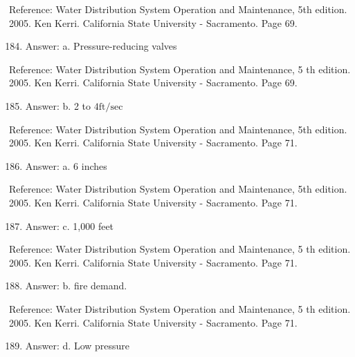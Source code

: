 \documentclass[10pt]{article}
\begin{document}
Reference: Water Distribution System Operation and Maintenance, 5th edition. 2005. Ken Kerri. California State University - Sacramento. Page 69.

\begin{enumerate}
  \setcounter{enumi}{183}
  \item Answer: a. Pressure-reducing valves
\end{enumerate}

Reference: Water Distribution System Operation and Maintenance, 5 th edition. 2005. Ken Kerri. California State University - Sacramento. Page 69.

\begin{enumerate}
  \setcounter{enumi}{184}
  \item Answer: b. 2 to $4 \mathrm{ft} / \mathrm{sec}$
\end{enumerate}

Reference: Water Distribution System Operation and Maintenance, 5th edition. 2005. Ken Kerri. California State University - Sacramento. Page 71.

\begin{enumerate}
  \setcounter{enumi}{185}
  \item Answer: a. 6 inches
\end{enumerate}

Reference: Water Distribution System Operation and Maintenance, 5th edition. 2005. Ken Kerri. California State University - Sacramento. Page 71.

\begin{enumerate}
  \setcounter{enumi}{186}
  \item Answer: c. 1,000 feet
\end{enumerate}

Reference: Water Distribution System Operation and Maintenance, 5 th edition. 2005. Ken Kerri. California State University - Sacramento. Page 71.

\begin{enumerate}
  \setcounter{enumi}{187}
  \item Answer: b. fire demand.
\end{enumerate}

Reference: Water Distribution System Operation and Maintenance, 5 th edition. 2005. Ken Kerri. California State University - Sacramento. Page 71.

\begin{enumerate}
  \setcounter{enumi}{188}
  \item Answer: d. Low pressure
\end{enumerate}
\end{document}
